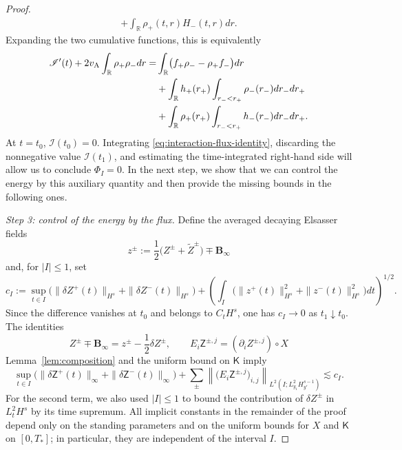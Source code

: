 \documentclass[11pt,reqno]{amsart}
\theoremstyle{plain}
\theoremstyle{definition}
\theoremstyle{remark}
\numberwithin{equation}{section}
\newcommand{\Kmat}{\mathsf K}
\newcommand{\Binf}{\mathbf B_\infty}
\newcommand{\Real}{\mathbb R}
\begin{document}
\begin{proof}
\[\begin{aligned}
 +\int_{\Real}\rho_+(t,r)H_-(t,r)dr.
\end{aligned}
\]
Expanding the two cumulative functions, this is equivalently
\begin{subequations}\label{eq:interaction-flux-identity}
\begin{align}
 \mathscr I'(t)+2v_{\rm A}\int_{\Real}\rho_+\rho_- dr
 =&\int_{\Real}\bigl(f_+\rho_--\rho_+f_-\bigr) dr \label{eq:longitudinalflux}\\
 &+\int_{\Real}h_+(r_+)
       \int_{r_-<r_+}\rho_-(r_-) dr_- dr_+\label{eq:sourceterm1}\\
 &+\int_{\Real}\rho_+(r_+)
       \int_{r_-<r_+}h_-(r_-) dr_- dr_+ \label{eq:sourceterm2}.
\end{align}
\end{subequations}
At $t=t_0$, $\mathscr I(t_0)=0$.  Integrating
\eqref{eq:interaction-flux-identity}, discarding the nonnegative value
$\mathscr I(t_1)$, and estimating the time-integrated right-hand side will
allow us to conclude $\Phi_I=0$.  In the next step, we show that
we can control the energy by this auxiliary quantity and then provide the
missing bounds in the following ones.

\emph{Step 3: control of the energy by the flux.}
Define the averaged decaying Elsasser fields
\[
 z^\pm:=\frac12\bigl(Z^\pm+\widetilde Z^\pm\bigr)\mp\Binf
\]
and, for $|I|\le1$, set
\[
 c_I:=
 \sup_{t\in I}\bigl(
  \|\delta Z^+(t)\|_{H^s}+\|\delta Z^-(t)\|_{H^s}\bigr)+\left(\int_I
  \bigl(\|z^+(t)\|_{H^s}^2+\|z^-(t)\|_{H^s}^2\bigr) dt
  \right)^{1/2}.
\]
Since the difference vanishes at $t_0$ and belongs to $C_tH^s$, one has
$c_I\to0$ as $t_1\downarrow t_0$.  The identities
\[
 Z^\pm\mp\Binf=z^\pm-\frac12\delta Z^\pm,
 \qquad
 E_i\mathsf Z^{\pm,j}=(\partial_iZ^{\pm,j})\circ X
\]
Lemma~\ref{lem:composition} and the uniform bound on $\Kmat$ imply
\begin{equation}\label{eq:uniqueness-small-coefficients}
 \sup_{t\in I}\bigl(
  \|\delta\mathsf Z^+(t)\|_\infty+
  \|\delta\mathsf Z^-(t)\|_\infty\bigr)+\sum_{\pm}
 \left\|\bigl(E_i\mathsf Z^{\pm,j}\bigr)_{i,j}\right\|_
 {L^2(I;L^2_{y_1}H^{s-1}_{y'})}
 \lesssim c_I .
\end{equation}
For the second term, we also used $|I|\le1$ to bound the contribution of
$\delta Z^\pm$ in $L^2_tH^s$ by its time supremum.
All implicit constants in the remainder of the proof depend only on the
standing parameters and on the uniform bounds for $X$ and $\Kmat$ on
$[0,T_*]$; in particular, they are independent of the interval $I$.


\end{proof}
\end{document}
